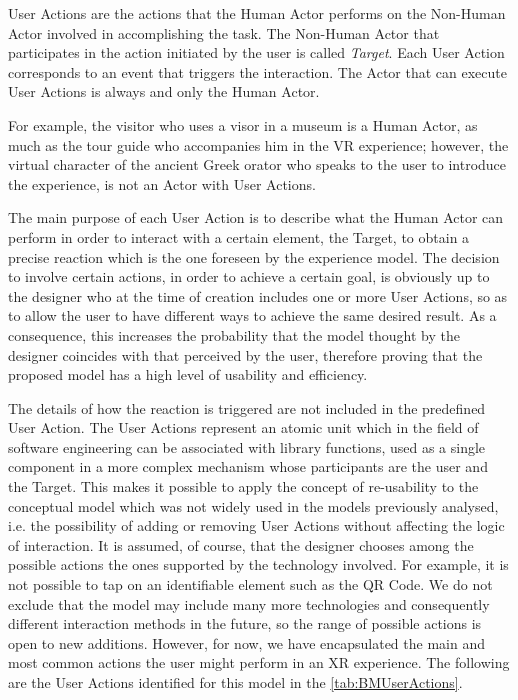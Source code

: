 User Actions are the actions that the Human Actor performs on the Non-Human Actor involved in accomplishing the task. The Non-Human Actor that participates in the action initiated by the user is called \emph{Target}.
Each User Action corresponds to an event that triggers the interaction. The Actor that can execute User Actions is always and only the Human Actor.

For example, the visitor who uses a visor in a museum is a Human Actor, as much as the tour guide who accompanies him in the VR experience; however, the virtual character of the ancient Greek orator who speaks to the user to introduce the experience, is not an Actor with User Actions.

The main purpose of each User Action is to describe what the Human Actor can perform in order to interact with a certain element, the Target, to obtain a precise reaction which is the one foreseen by the experience model. The decision to involve certain actions, in order to achieve a certain goal, is obviously up to the designer who at the time of creation includes one or more User Actions, so as to allow the user to have different ways to achieve the same desired result. As a consequence, this increases the probability that the model thought by the designer coincides with that perceived by the user, therefore proving that the proposed model has a high level of usability and efficiency. 

The details of how the reaction is triggered are not included in the predefined User Action. The User Actions represent an atomic unit which in the field of software engineering can be associated with library functions, used as a single component in a more complex mechanism whose participants are the user and the Target. 
This makes it possible to apply the concept of re-usability to the conceptual model which was not widely used in the models previously analysed, i.e. the possibility of adding or removing User Actions without affecting the logic of interaction. It is assumed, of course, that the designer chooses among the possible actions the ones supported by the technology involved. For example, it is not possible to tap on an identifiable element such as the QR Code. We do not exclude that the model may include many more technologies and consequently different interaction methods in the future, so the range of possible actions is open to new additions. However, for now, we have encapsulated the main and most common actions the user might perform in an XR experience.
The following are the User Actions identified for this model in the \autoref{tab:BMUserActions}.

